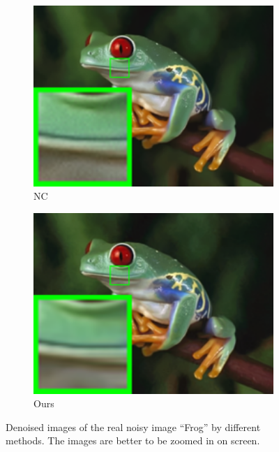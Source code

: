 \begin{figure}
\begin{subfigure}[t]{0.19\textwidth}
        \includegraphics[width=1\textwidth]{images/guided/nc/resize_br_NC_frog.png}
\caption{NC}
    \end{subfigure}
    \hfill
    \begin{subfigure}[t]{0.19\textwidth}
        \centering
        \includegraphics[width=1\textwidth]{images/guided/nc/resize_br_Guided_frog.png}
\caption{Ours}
    \end{subfigure}
    \caption{Denoised images of the real noisy image ``Frog'' \cite{ncwebsite} by different methods. The images are better to be zoomed in on screen.}
    \label{fig3-10}
\end{figure}

